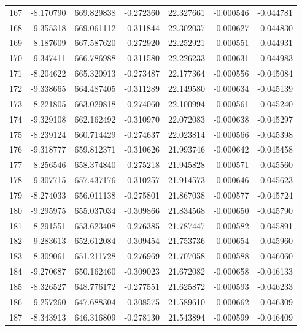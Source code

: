 \begin{tabular}{rrrrrrr}
 167 &  -8.170790 &  669.829838 & -0.272360 &   22.327661 &   -0.000546 & -0.044781 \\
 168 &  -9.355318 &  669.061112 & -0.311844 &   22.302037 &   -0.000627 & -0.044830 \\
 169 &  -8.187609 &  667.587620 & -0.272920 &   22.252921 &   -0.000551 & -0.044931 \\
 170 &  -9.347411 &  666.786988 & -0.311580 &   22.226233 &   -0.000631 & -0.044983 \\
 171 &  -8.204622 &  665.320913 & -0.273487 &   22.177364 &   -0.000556 & -0.045084 \\
 172 &  -9.338665 &  664.487405 & -0.311289 &   22.149580 &   -0.000634 & -0.045139 \\
 173 &  -8.221805 &  663.029818 & -0.274060 &   22.100994 &   -0.000561 & -0.045240 \\
 174 &  -9.329108 &  662.162492 & -0.310970 &   22.072083 &   -0.000638 & -0.045297 \\
 175 &  -8.239124 &  660.714429 & -0.274637 &   22.023814 &   -0.000566 & -0.045398 \\
 176 &  -9.318777 &  659.812371 & -0.310626 &   21.993746 &   -0.000642 & -0.045458 \\
 177 &  -8.256546 &  658.374840 & -0.275218 &   21.945828 &   -0.000571 & -0.045560 \\
 178 &  -9.307715 &  657.437176 & -0.310257 &   21.914573 &   -0.000646 & -0.045623 \\
 179 &  -8.274033 &  656.011138 & -0.275801 &   21.867038 &   -0.000577 & -0.045724 \\
 180 &  -9.295975 &  655.037034 & -0.309866 &   21.834568 &   -0.000650 & -0.045790 \\
 181 &  -8.291551 &  653.623408 & -0.276385 &   21.787447 &   -0.000582 & -0.045891 \\
 182 &  -9.283613 &  652.612084 & -0.309454 &   21.753736 &   -0.000654 & -0.045960 \\
 183 &  -8.309061 &  651.211728 & -0.276969 &   21.707058 &   -0.000588 & -0.046060 \\
 184 &  -9.270687 &  650.162460 & -0.309023 &   21.672082 &   -0.000658 & -0.046133 \\
 185 &  -8.326527 &  648.776172 & -0.277551 &   21.625872 &   -0.000593 & -0.046233 \\
 186 &  -9.257260 &  647.688304 & -0.308575 &   21.589610 &   -0.000662 & -0.046309 \\
 187 &  -8.343913 &  646.316809 & -0.278130 &   21.543894 &   -0.000599 & -0.046409 \\

\end{tabular}
